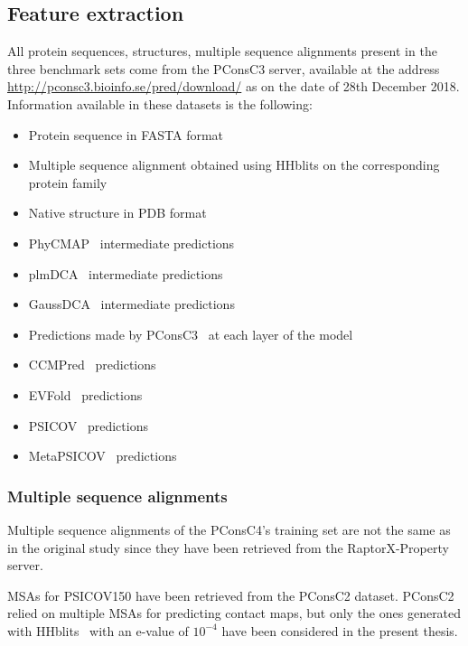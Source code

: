   \subsection{Feature extraction}

    All protein sequences, structures, multiple sequence alignments present in the three benchmark sets come from the PConsC3 server,
    available at the address \url{http://pconsc3.bioinfo.se/pred/download/} as on the date of 28th December 2018.
    Information available in these datasets is the following:

    \begin{itemize}
      \item Protein sequence in FASTA format
      \item Multiple sequence alignment obtained using HHblits on the corresponding protein family
      \item Native structure in PDB format
      \item PhyCMAP~\cite{PhyCMap} intermediate predictions
      \item plmDCA~\cite{EKEBERG2014341} intermediate predictions
      \item GaussDCA~\cite{10.1371/journal.pone.0092721} intermediate predictions
      \item Predictions made by PConsC3~\cite{Skwark079673} at each layer of the model
      \item CCMPred~\cite{CCMPred} predictions
      \item EVFold~\cite{Sheridan021022} predictions
      \item PSICOV~\cite{doi:10.1093/bioinformatics/btr638} predictions
      \item MetaPSICOV~\cite{MetaPSICOV} predictions
    \end{itemize}

    \subsubsection{Multiple sequence alignments}

        Multiple sequence alignments of the PConsC4's training set are not the same
        as in the original study since they have been retrieved from the
        RaptorX-Property server.

        MSAs for PSICOV150 have been retrieved from the PConsC2 dataset.
        PConsC2 relied on multiple MSAs for predicting contact maps,
        but only the ones generated with HHblits~\cite{HHblits}
        with an e-value of $10^{-4}$
        have been considered in the present thesis.

